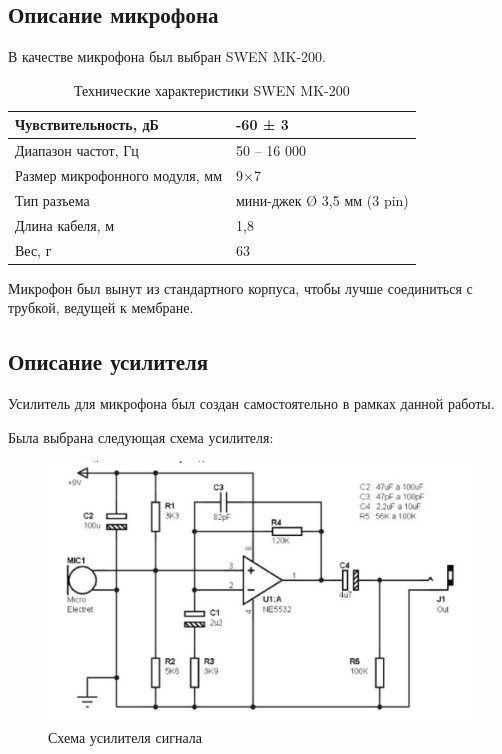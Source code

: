 \documentclass[../paper.tex]{subfiles}
\begin{document}
\subsection{Описание микрофона}
В качестве микрофона был выбран SWEN MK-200. \\

\begin{table}[h]
\centering
\label{my-label}
\begin{tabular}{|l|l|}
\hline
Чувствительность, дБ           & -60 ± 3                    \\ \hline
Диапазон частот, Гц            & 50 – 16 000                \\ \hline
Размер микрофонного модуля, мм & 9×7                        \\ \hline
Тип разъема                    & мини-джек Ø 3,5 мм (3 pin) \\ \hline
Длина кабеля, м                & 1,8                        \\ \hline
Вес, г                         & 63                         \\ \hline
\end{tabular}
\caption{Технические характеристики SWEN MK-200}
\end{table}

Микрофон был вынут из стандартного корпуса, чтобы лучше соединиться с трубкой, ведущей к мембране.

\subsection{Описание усилителя}
Усилитель для микрофона был создан самостоятельно в рамках данной работы.

Была выбрана следующая схема усилителя:

\begin{figure}[H]
\centering
\includegraphics[width=14cm]{images/circuit.jpg}
\caption{Схема усилителя сигнала}
\end{figure}
\end{document}
